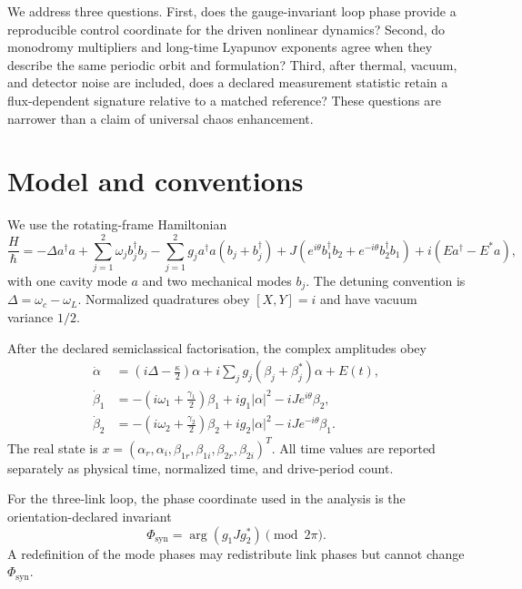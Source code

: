 \documentclass[aip,cha,reprint]{revtex4-2}
\begin{document}
We address three questions. First, does the gauge-invariant loop phase provide a
reproducible control coordinate for the driven nonlinear dynamics? Second, do
monodromy multipliers and long-time Lyapunov exponents agree when they describe the
same periodic orbit and formulation? Third, after thermal, vacuum, and detector
noise are included, does a declared measurement statistic retain a flux-dependent
signature relative to a matched reference? These questions are
narrower than a claim of universal chaos enhancement.

\section{Model and conventions}

We use the rotating-frame Hamiltonian
\begin{equation}
\frac{H}{\hbar}=-\Delta a^\dagger a
+\sum_{j=1}^{2}\omega_j b_j^\dagger b_j
-\sum_{j=1}^{2}g_j a^\dagger a(b_j+b_j^\dagger)
+J\left(e^{i\theta}b_1^\dagger b_2+e^{-i\theta}b_2^\dagger b_1\right)
+i(Ea^\dagger-E^*a),
\label{eq:hamiltonian}
\end{equation}
with one cavity mode $a$ and two mechanical modes $b_j$. The detuning convention is
$\Delta=\omega_c-\omega_L$. Normalized quadratures obey
$[X,Y]=i$ and have vacuum variance $1/2$.

After the declared semiclassical factorisation, the complex amplitudes obey
\begin{align}
\dot\alpha &= \left(i\Delta-\frac{\kappa}{2}\right)\alpha
+i\sum_jg_j(\beta_j+\beta_j^*)\alpha+E(t),\\
\dot\beta_1 &= -\left(i\omega_1+\frac{\gamma_1}{2}\right)\beta_1
+ig_1|\alpha|^2-iJe^{i\theta}\beta_2,\\
\dot\beta_2 &= -\left(i\omega_2+\frac{\gamma_2}{2}\right)\beta_2
+ig_2|\alpha|^2-iJe^{-i\theta}\beta_1.
\label{eq:complex-eom}
\end{align}
The real state is
$x=(\alpha_r,\alpha_i,\beta_{1r},\beta_{1i},\beta_{2r},\beta_{2i})^T$.
All time values are reported separately as physical time, normalized time, and
drive-period count.

For the three-link loop, the phase coordinate used in the analysis is the
orientation-declared invariant
\begin{equation}
\Phi_{\mathrm{syn}}=\arg(g_1Jg_2^*)\pmod{2\pi}.
\label{eq:flux}
\end{equation}
A redefinition of the mode phases may redistribute link phases but cannot change
$\Phi_{\mathrm{syn}}$.
\end{document}
